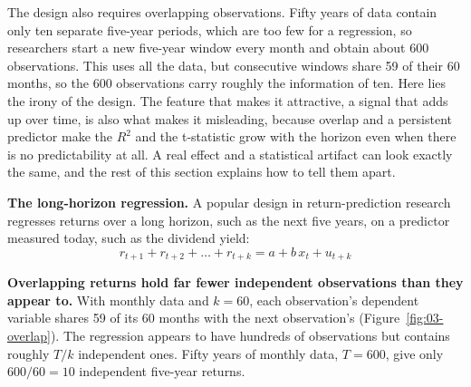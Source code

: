 The design also requires overlapping observations. Fifty years of data contain only ten separate five-year periods, which are too few for a regression, so researchers start a new five-year window every month and obtain about 600 observations. This uses all the data, but consecutive windows share 59 of their 60 months, so the 600 observations carry roughly the information of ten. Here lies the irony of the design. The feature that makes it attractive, a signal that adds up over time, is also what makes it misleading, because overlap and a persistent predictor make the $R^2$ and the t-statistic grow with the horizon even when there is no predictability at all. A real effect and a statistical artifact can look exactly the same, and the rest of this section explains how to tell them apart.

\textbf{The long-horizon regression.} A popular design in return-prediction research regresses
returns over a long horizon, such as the next five years, on a predictor
measured today, such as the dividend yield:
\begin{equation}
  r_{t+1} + r_{t+2} + \dots + r_{t+k} = a + b\,x_t + u_{t+k}
  \label{eq:03-longhorizon}
\end{equation}

\textbf{Overlapping returns hold far fewer independent observations than they appear to.} With monthly data and $k = 60$,
each observation's dependent variable shares 59 of its 60 months with the next
observation's (Figure~\ref{fig:03-overlap}). The regression appears to have
hundreds of observations but contains roughly $T/k$ independent ones. Fifty
years of monthly data, $T = 600$, give only $600/60 = 10$ independent five-year
returns.




